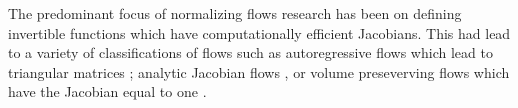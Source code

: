 The predominant focus of normalizing flows research has been on defining invertible functions which have computationally efficient Jacobians. This had lead to a variety of classifications of flows such as autoregressive flows which lead to triangular matrices \cite{kingma2016IAF, papamakarios2017MAF}; analytic Jacobian flows \cite{rezende2015VIwithNF,vdberg2018sylvester}, or volume preseverving flows which have the Jacobian equal to one \cite{tomczak2016Householder,tran2019discreteflows,hoogeboom2019IntegerDiscreteFlows}.



















